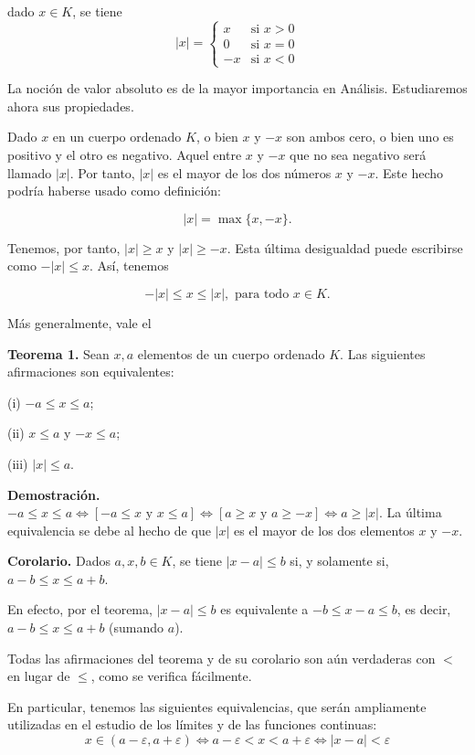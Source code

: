 \documentclass[12pt,oneside]{book}
\begin{document}
dado \(x \in K\), se tiene
\[
|x| = 
\begin{cases}
x & \text{si } x > 0 \\
0 & \text{si } x = 0 \\
-x & \text{si } x < 0
\end{cases}
\]

La noción de valor absoluto es de la mayor importancia en Análisis. Estudiaremos ahora sus propiedades.

Dado \(x\) en un cuerpo ordenado \(K\), o bien \(x\) y \(-x\) son ambos cero, o bien uno es positivo y el otro es negativo. Aquel entre \(x\) y \(-x\) que no sea negativo será llamado \(|x|\). Por tanto, \(|x|\) es el mayor de los dos números \(x\) y \(-x\). Este hecho podría haberse usado como definición:

\[|x| = \max\{x, -x\}.\]

Tenemos, por tanto, \(|x| \geq x\) y \(|x| \geq -x\). Esta última desigualdad puede escribirse como \(-|x| \leq x\). Así, tenemos

\[-|x| \leq x \leq |x|, \text{ para todo } x \in K.\]

Más generalmente, vale el

\textbf{Teorema 1.} Sean \(x, a\) elementos de un cuerpo ordenado \(K\). Las siguientes afirmaciones son equivalentes:

(i) \(-a \leq x \leq a\);

(ii) \(x \leq a\) y \(-x \leq a\);

(iii) \(|x| \leq a\).

\textbf{Demostración.} \(-a \leq x \leq a \Leftrightarrow [-a \leq x \text{ y } x \leq a] \Leftrightarrow [a \geq x \text{ y } a \geq -x] \Leftrightarrow a \geq |x|\). La última equivalencia se debe al hecho de que \(|x|\) es el mayor de los dos elementos \(x\) y \(-x\).

\textbf{Corolario.} Dados \(a, x, b \in K\), se tiene \(|x-a| \leq b\) si, y solamente si, \(a-b \leq x \leq a+b\).

En efecto, por el teorema, \(|x-a| \leq b\) es equivalente a \(-b \leq x-a \leq b\), es decir, \(a-b \leq x \leq a+b\) (sumando \(a\)).

 Todas las afirmaciones del teorema y de su corolario son aún verdaderas con \(<\) en lugar de \(\leq\), como se verifica fácilmente.

En particular, tenemos las siguientes equivalencias, que serán ampliamente utilizadas en el estudio de los límites y de las funciones continuas:
\[\boxed{x \in (a-\varepsilon, a+\varepsilon) \Leftrightarrow a-\varepsilon < x < a+\varepsilon \Leftrightarrow |x-a| < \varepsilon}\]
\end{document}
